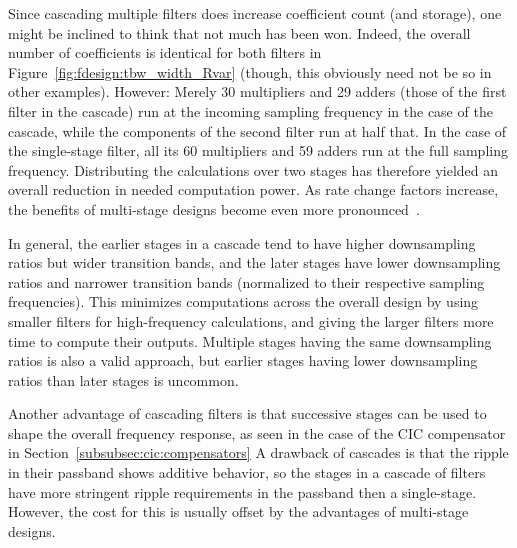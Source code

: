 Since  cascading  multiple  filters   does  increase  coefficient  count  (and
storage), one might  be inclined to think that not  much has been won. Indeed,
the  overall  number  of  coefficients   is  identical  for  both  filters  in
Figure~\ref{fig:fdesign:tbw_width_Rvar}  (though, this  obviously need  not be
so  in  other  examples). However: Merely \num{30}  multipliers  and  \num{29}
adders  (those  of the  first  filter  in the  cascade)  run  at the  incoming
sampling  frequency in  the  case  of the  cascade,  while  the components  of
the  second  filter  run at  half  that.   In  the  case of  the  single-stage
filter,  all  its  \num{60}  multipliers   and  \num{59}  adders  run  at  the
full  sampling frequency. Distributing  the calculations  over two  stages has
therefore yielded  an overall reduction  in needed computation  power. As rate
change  factors increase,  the  benefits of  multi-stage  designs become  even
more pronounced~\cite{crochiere-rabiner:multirate-dsp}. 

In general, the  earlier stages in a cascade tend  to have higher downsampling
ratios  but  wider   transition  bands,  and  the  later   stages  have  lower
downsampling  ratios  and  narrower  transition  bands  (normalized  to  their
respective  sampling frequencies).   This  minimizes  computations across  the
overall design by  using smaller filters for  high-frequency calculations, and
giving the larger filters more  time to compute their outputs. Multiple stages
having the  same downsampling  ratios is  also a  valid approach,  but earlier
stages having lower downsampling ratios than later stages is uncommon.

Another advantage of  cascading filters is that successive stages  can be used
to  shape the  overall frequency  response, as  seen in  the case  of the  CIC
compensator in Section~\ref{subsubsec:cic:compensators} A drawback of cascades
is that the ripple in their passband shows additive behavior, so the stages in
a cascade of  filters have more stringent ripple requirements  in the passband
then  a single-stage. However,  the cost  for this  is usually  offset by  the
advantages of multi-stage designs.

